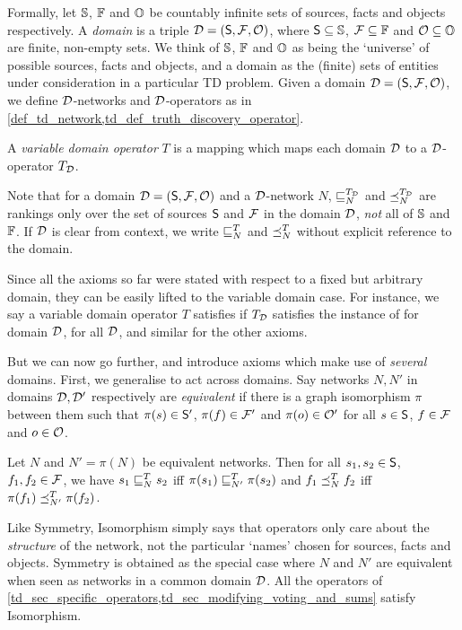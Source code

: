 Formally, let $\uS$, $\uF$ and $\uO$ be countably infinite sets of sources,
facts and objects respectively. A \emph{domain} is a triple $\D = (\S, \F,
\O)$, where $\S \subseteq \uS$, $\F \subseteq \uF$ and $\O \subseteq \uO$ are
finite, non-empty sets. We think of $\uS$, $\uF$ and $\uO$ as being the
`universe' of possible sources, facts and objects, and a domain as the (finite)
sets of entities under consideration in a particular TD problem. Given a domain
$\D = (\S, \F, \O)$, we define $\D$-networks and $\D$-operators as in
\cref{def_td_network,td_def_truth_discovery_operator}.

\begin{definition}
    A \emph{variable domain operator} $T$ is a mapping which maps each domain
    $\D$ to a $\D$-operator $T_\D$.
\end{definition}

Note that for a domain $\D = (\S, \F, \O)$ and a $\D$-network $N$,
$\sle_N^{T_\D}$ and $\fle_N^{T_\D}$ are rankings only over the set of sources
$\S$ and $\F$ in the domain $\D$, \emph{not} all of $\uS$ and $\uF$. If $\D$ is
clear from context, we write $\sle_N^T$ and $\fle_N^T$ without explicit
reference to the domain.

Since all the axioms so far were stated with respect to a fixed but arbitrary
domain, they can be easily lifted to the variable domain case. For instance, we
say a variable domain operator $T$ satisfies \coherence{} if $T_\D$ satisfies the
instance of \coherence{} for domain $\D$, for all $\D$, and similar for the other
axioms.

But we can now go further, and introduce axioms which make use of
\emph{several} domains. First, we generalise \symmetry{} to act across domains.
Say networks $N, N'$ in domains $\D, \D'$ respectively are \emph{equivalent} if
there is a graph isomorphism $\pi$ between them such that $\pi(s) \in \S'$,
$\pi(f) \in \F'$ and $\pi(o) \in \O'$ for all $s \in \S$, $f \in \F$ and $o \in
\O$.

\begin{axiom}[Isomorphism]
    Let $N$ and $N' = \pi(N)$ be equivalent networks. Then for all $s_1, s_2
    \in \S$, $f_1, f_2 \in \F$, we have $s_1 \sle_N^T s_2$ iff $\pi(s_1)
    \sle_{N'}^T \pi(s_2)$ and $f_1 \fle_N^T f_2$ iff $\pi(f_1) \fle_{N'}^T
    \pi(f_2)$.
\end{axiom}

Like Symmetry, Isomorphism simply says that operators only care about the
\emph{structure} of the network, not the particular `names' chosen for sources,
facts and objects. Symmetry is obtained as the special case where $N$ and $N'$
are equivalent when seen as networks in a common domain $\D$. All the operators
of \cref{td_sec_specific_operators,td_sec_modifying_voting_and_sums} satisfy
Isomorphism.

